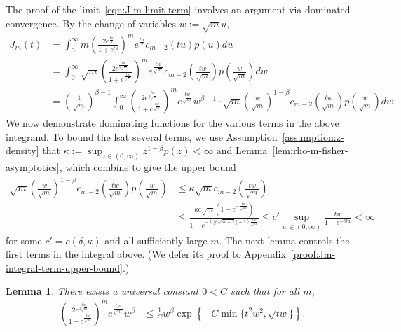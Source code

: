 \documentclass[11pt]{article}
\newcommand{\brc}[1]{\left\{{#1}\right\}}
\newcommand{\prn}[1]{\left({#1}\right)} %
\newcommand{\<}{\langle} %
\renewcommand{\>}{\rangle}
\newtheorem{lemma}[claim]{Lemma}
\begin{document}
The proof of the limit~\eqref{eqn:J-m-limit-term} involves
an argument via dominated convergence.
By the change of variables $w := \sqrt{m} u$,
\begin{align*}
	 J_m(t) & =  \int_0^\infty m \prn{\frac{2e^{\frac{tu}{2}}}{1 + e^{tu}}}^{m} e^{\frac{tu}{2}} c_{m-2}(tu) p(u) du \nonumber \\
	 & =  \int_0^\infty \sqrt{m} \prn{\frac{2e^{\frac{tw}{2\sqrt{m}}}}{1 + e^{\frac{tw}{\sqrt{m}}}}}^{m} e^{\frac{tw}{\sqrt{m}}} c_{m-2}\prn{\frac{tw}{\sqrt{m}}} p \prn{\frac{w}{\sqrt{m}}} dw \nonumber  \\
	 & = \prn{\frac{1}{\sqrt{m}}}^{\beta-1} \int_0^\infty \prn{\frac{2e^{\frac{tw}{2\sqrt{m}}}}{1 + e^{\frac{tw}{\sqrt{m}}}}}^{m} e^{\frac{tw}{\sqrt{m}}} w^{\beta-1} \cdot \sqrt{m}  \prn{\frac{w}{\sqrt{m}}}^{1-\beta} c_{m-2}\prn{\frac{tw}{\sqrt{m}}} p \prn{\frac{w}{\sqrt{m}}} dw.
\end{align*}
We now demonstrate dominating functions for the various terms in the above
integrand. To bound the lsat several terms,
we use Assumption~\ref{assumption:z-density} that $\kappa := \sup_{z
  \in (0, \infty)} z^{1-\beta} p(z) < \infty$ and
Lemma~\ref{lem:rho-m-fisher-asymptotics}, which combine
to give the upper bound
\begin{align*}
  \sqrt{m}  \prn{\frac{w}{\sqrt{m}}}^{1-\beta} c_{m-2}\prn{\frac{tw}{\sqrt{m}}} p \prn{\frac{w}{\sqrt{m}}}
  & \leq  \kappa  \sqrt{m} c_{m-2} \prn{\frac{tw}{\sqrt{m}}} \\
  & \leq  \frac{\kappa  c\sqrt{m}\prn{1 - e^{-\frac{tw}{\sqrt{m}}}}}{1 - e^{-(\lfloor \delta \sqrt{m-2} \rfloor + 1) \frac{tw}{\sqrt{m}}}}
  \leq c' \sup_{w \in (0, \infty)} \frac{ tw}{1 - e^{-\delta tw}} < \infty
\end{align*}
for some $c' = c(\delta, \kappa)$ and all sufficiently large $m$.  The next
lemma controls the first terms in the integral above. (We defer its proof to
Appendix~\ref{proof:Jm-integral-term-upper-bound}.)
\begin{lemma} \label{lem:Jm-integral-term-upper-bound}
  There exists a universal constant $0 < C$ such that for all $m$,
  \begin{align*}
    \prn{\frac{2e^{\frac{tw}{2\sqrt{m}}}}{1 + e^{\frac{tw}{\sqrt{m}}}}}^{m} e^{\frac{tw}{\sqrt{m}}} w^\beta   & \leq \frac{1}{C}
    w^\beta \exp \brc{-C \min \{t^2w^2, \sqrt{tw}\}}.
  \end{align*}
\end{lemma}
\end{document}
